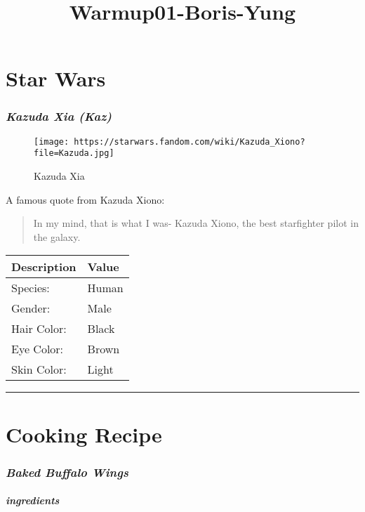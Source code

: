 \documentclass[]{article}
\title{Warmup01-Boris-Yung}
\author{}
\date{}
\let\oldsubparagraph\subparagraph
\renewcommand{\subparagraph}[1]{\oldsubparagraph{#1}\mbox{}}
\begin{document}
\maketitle

\section{\texorpdfstring{\textbf{Star
Wars}}{Star Wars}}\label{star-wars}

\subsubsection{\texorpdfstring{\emph{Kazuda Xia
(Kaz)}}{Kazuda Xia (Kaz)}}\label{kazuda-xia-kaz}

\begin{figure}
\centering
\texttt{[image: https://starwars.fandom.com/wiki/Kazuda\_Xiono?file=Kazuda.jpg]}
\caption{Kazuda Xia}
\end{figure}

A famous quote from Kazuda Xiono:

\begin{quote}
In my mind, that is what I was- Kazuda Xiono, the best starfighter pilot
in the galaxy.
\end{quote}

\begin{longtable}[]{@{}ll@{}}
\toprule
Description & Value\tabularnewline
\midrule
\endhead
Species: & Human\tabularnewline
Gender: & Male\tabularnewline
Hair Color: & Black\tabularnewline
Eye Color: & Brown\tabularnewline
Skin Color: & Light\tabularnewline
\bottomrule
\end{longtable}

\begin{center}\rule{0.5\linewidth}{\linethickness}\end{center}

\section{\texorpdfstring{\textbf{Cooking
Recipe}}{Cooking Recipe}}\label{cooking-recipe}

\subsubsection{\texorpdfstring{\emph{Baked Buffalo
Wings}}{Baked Buffalo Wings}}\label{baked-buffalo-wings}

\subparagraph{ingredients}\label{ingredients}
\end{document}
